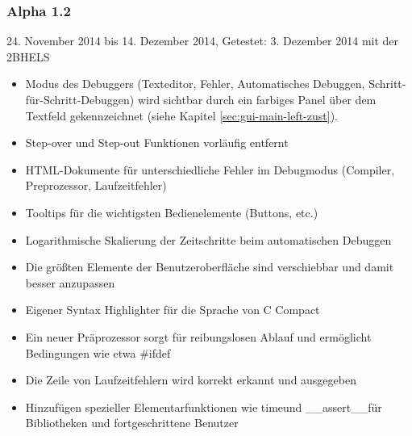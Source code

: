 \subsubsection*{Alpha 1.2}
24. November 2014 bis 14. Dezember 2014,\newline
Getestet: 3. Dezember 2014 mit der 2BHELS
\begin{itemize}
\item Modus des Debuggers (Texteditor, Fehler, Automatisches Debuggen, Schritt-für-Schritt-Debuggen) wird sichtbar durch ein farbiges Panel über dem Textfeld gekennzeichnet (siehe Kapitel \ref{sec:gui-main-left-zust}).
\item Step-over und Step-out Funktionen vorläufig entfernt
\item HTML-Dokumente für unterschiedliche Fehler im Debugmodus (Compiler, Preprozessor, Laufzeitfehler)
\item Tooltips für die wichtigsten Bedienelemente (Buttons, etc.)
\item Logarithmische Skalierung der Zeitschritte beim automatischen Debuggen
\item Die größten Elemente der Benutzeroberfläche sind verschiebbar und damit besser anzupassen
\item Eigener Syntax Highlighter für die Sprache von C Compact 
\item Ein neuer Präprozessor sorgt für reibungslosen Ablauf und ermöglicht Bedingungen wie etwa \glqq \#ifdef\grqq
\item Die Zeile von Laufzeitfehlern wird korrekt erkannt und ausgegeben
\item Hinzufügen spezieller Elementarfunktionen wie \glqq time\grqq und \glqq \_\_assert\_\_\grqq für Bibliotheken und fortgeschrittene Benutzer
\end{itemize}

